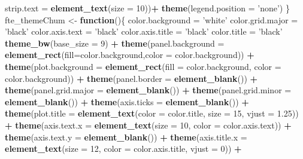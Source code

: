 \documentclass[]{article}
\newenvironment{Shaded}{\begin{snugshade}}{\end{snugshade}}
\newcommand{\KeywordTok}[1]{\textcolor[rgb]{0.13,0.29,0.53}{\textbf{#1}}}
\newcommand{\DataTypeTok}[1]{\textcolor[rgb]{0.13,0.29,0.53}{#1}}
\newcommand{\DecValTok}[1]{\textcolor[rgb]{0.00,0.00,0.81}{#1}}
\newcommand{\FloatTok}[1]{\textcolor[rgb]{0.00,0.00,0.81}{#1}}
\newcommand{\StringTok}[1]{\textcolor[rgb]{0.31,0.60,0.02}{#1}}
\newcommand{\ControlFlowTok}[1]{\textcolor[rgb]{0.13,0.29,0.53}{\textbf{#1}}}
\newcommand{\OperatorTok}[1]{\textcolor[rgb]{0.81,0.36,0.00}{\textbf{#1}}}
\newcommand{\NormalTok}[1]{#1}
\begin{document}
\begin{Shaded}
\begin{Highlighting}[]
          \DataTypeTok{strip.text =} \KeywordTok{element_text}\NormalTok{(}\DataTypeTok{size =} \DecValTok{10}\NormalTok{))}\OperatorTok{+}
\StringTok{    }\KeywordTok{theme}\NormalTok{(}\DataTypeTok{legend.position =} \StringTok{'none'}\NormalTok{)}
\NormalTok{\} }
\NormalTok{fte_themeChum <-}\StringTok{ }\ControlFlowTok{function}\NormalTok{()\{}
\NormalTok{  color.background =}\StringTok{ 'white'}
\NormalTok{  color.grid.major =}\StringTok{ 'black'}
\NormalTok{  color.axis.text =}\StringTok{ 'black'}
\NormalTok{  color.axis.title =}\StringTok{ 'black'}
\NormalTok{  color.title =}\StringTok{ 'black'}
  \KeywordTok{theme_bw}\NormalTok{(}\DataTypeTok{base_size =} \DecValTok{9}\NormalTok{) }\OperatorTok{+}\StringTok{ }
\StringTok{    }\KeywordTok{theme}\NormalTok{(}\DataTypeTok{panel.background =} \KeywordTok{element_rect}\NormalTok{(}\DataTypeTok{fill=}\NormalTok{color.background,}\DataTypeTok{color =}\NormalTok{ color.background)) }\OperatorTok{+}
\StringTok{    }\KeywordTok{theme}\NormalTok{(}\DataTypeTok{plot.background =} \KeywordTok{element_rect}\NormalTok{(}\DataTypeTok{fill =}\NormalTok{ color.background, }\DataTypeTok{color =}\NormalTok{ color.background)) }\OperatorTok{+}
\StringTok{    }\KeywordTok{theme}\NormalTok{(}\DataTypeTok{panel.border =} \KeywordTok{element_blank}\NormalTok{()) }\OperatorTok{+}
\StringTok{    }\KeywordTok{theme}\NormalTok{(}\DataTypeTok{panel.grid.major =} \KeywordTok{element_blank}\NormalTok{()) }\OperatorTok{+}\StringTok{ }
\StringTok{    }\KeywordTok{theme}\NormalTok{(}\DataTypeTok{panel.grid.minor =} \KeywordTok{element_blank}\NormalTok{()) }\OperatorTok{+}\StringTok{ }
\StringTok{    }\KeywordTok{theme}\NormalTok{(}\DataTypeTok{axis.ticks =} \KeywordTok{element_blank}\NormalTok{()) }\OperatorTok{+}
\StringTok{    }\KeywordTok{theme}\NormalTok{(}\DataTypeTok{plot.title =} \KeywordTok{element_text}\NormalTok{(}\DataTypeTok{color =}\NormalTok{ color.title, }\DataTypeTok{size =} \DecValTok{15}\NormalTok{, }\DataTypeTok{vjust =} \FloatTok{1.25}\NormalTok{)) }\OperatorTok{+}
\StringTok{    }\KeywordTok{theme}\NormalTok{(}\DataTypeTok{axis.text.x =} \KeywordTok{element_text}\NormalTok{(}\DataTypeTok{size =} \DecValTok{10}\NormalTok{, }\DataTypeTok{color =}\NormalTok{ color.axis.text)) }\OperatorTok{+}\StringTok{ }
\StringTok{    }\KeywordTok{theme}\NormalTok{(}\DataTypeTok{axis.text.y =} \KeywordTok{element_blank}\NormalTok{()) }\OperatorTok{+}\StringTok{ }
\StringTok{    }\KeywordTok{theme}\NormalTok{(}\DataTypeTok{axis.title.x =} \KeywordTok{element_text}\NormalTok{(}\DataTypeTok{size =} \DecValTok{12}\NormalTok{, }\DataTypeTok{color =}\NormalTok{ color.axis.title, }\DataTypeTok{vjust =} \DecValTok{0}\NormalTok{)) }\OperatorTok{+}

\end{Highlighting}
\end{Shaded}
\end{document}
